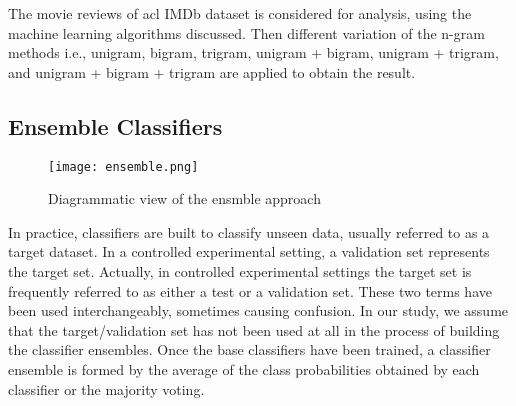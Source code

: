\documentclass[10pt]{article}
\begin{document}
{The movie reviews of acl IMDb
dataset is considered for analysis, using the machine learning algorithms discussed. Then different variation
of the n-gram methods i.e., unigram, bigram, trigram, unigram + bigram, unigram + trigram, and unigram + bigram
+ trigram are applied to obtain the result.
\subsection{Ensemble Classifiers}
\begin{figure}[!h]
\centering
\texttt{[image: ensemble.png]}
\caption{Diagrammatic view of the ensmble approach}
\end{figure}
In practice, classifiers are built to classify unseen data, usually referred 
to as a target dataset. In a controlled experimental setting, a validation set represents the target
set. Actually, in controlled experimental settings the target set is frequently 
referred to as either a test or a validation set. These two terms
have been used interchangeably, sometimes causing confusion. In our
study, we assume that the target/validation set has not been used at
all in the process of building the classifier ensembles. Once the base
 classifiers have been trained, a classifier ensemble is formed by the
average of the class probabilities obtained by each classifier or the
majority voting.


}
\end{document}
